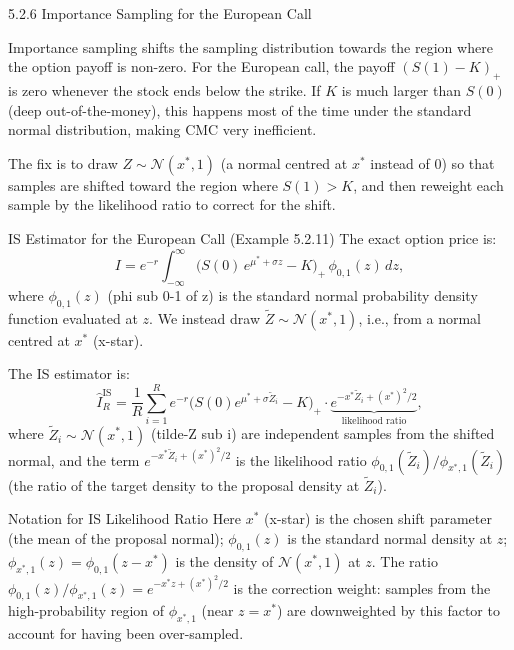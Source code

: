 \documentclass[aspectratio=169,10pt]{beamer}
\begin{document}
\begin{frame}[allowframebreaks]{5.2.6 Importance Sampling for the European Call}

Importance sampling shifts the sampling distribution towards the region where
the option payoff is non-zero.  For the European call, the payoff
$(S(1) - K)_+$ is zero whenever the stock ends below the strike.  If $K$ is
much larger than $S(0)$ (deep out-of-the-money), this happens most of the time
under the standard normal distribution, making CMC very inefficient.

The fix is to draw $Z \sim \mathcal{N}(x^*, 1)$ (a normal centred at $x^*$
instead of 0) so that samples are shifted toward the region where $S(1) > K$,
and then reweight each sample by the likelihood ratio to correct for the shift.

\begin{block}{IS Estimator for the European Call (Example 5.2.11)}
  The exact option price is:
  \[
    I = e^{-r}\int_{-\infty}^{\infty}
    \bigl(S(0)\,e^{\mu^* + \sigma z} - K\bigr)_+\,\phi_{0,1}(z)\,dz,
  \]
  where $\phi_{0,1}(z)$ (phi sub 0-1 of z) is the standard normal probability
  density function evaluated at $z$.  We instead draw $\tilde{Z} \sim
  \mathcal{N}(x^*, 1)$, i.e., from a normal centred at $x^*$ (x-star).

  The IS estimator is:
  \[
    \hat{I}_R^{\mathrm{IS}} = \frac{1}{R}\sum_{i=1}^R
    e^{-r}\bigl(S(0)e^{\mu^* + \sigma\tilde{Z}_i} - K\bigr)_+
    \cdot\underbrace{e^{-x^*\tilde{Z}_i + (x^*)^2/2}}_{\text{likelihood ratio}},
  \]
  where $\tilde{Z}_i \sim \mathcal{N}(x^*, 1)$ (tilde-Z sub i) are independent
  samples from the shifted normal, and the term $e^{-x^*\tilde{Z}_i + (x^*)^2/2}$
  is the likelihood ratio $\phi_{0,1}(\tilde{Z}_i)/\phi_{x^*,1}(\tilde{Z}_i)$
  (the ratio of the target density to the proposal density at $\tilde{Z}_i$).
\end{block}

\framebreak

\begin{block}{Notation for IS Likelihood Ratio}
  Here $x^*$ (x-star) is the chosen shift parameter (the mean of the proposal
  normal); $\phi_{0,1}(z)$ is the standard normal density at $z$;
  $\phi_{x^*,1}(z) = \phi_{0,1}(z - x^*)$ is the density of $\mathcal{N}(x^*, 1)$
  at $z$.  The ratio $\phi_{0,1}(z)/\phi_{x^*,1}(z) = e^{-x^*z + (x^*)^2/2}$
  is the correction weight: samples from the high-probability region of
  $\phi_{x^*,1}$ (near $z = x^*$) are downweighted by this factor to account
  for having been over-sampled.
\end{block}


\end{frame}
\end{document}
